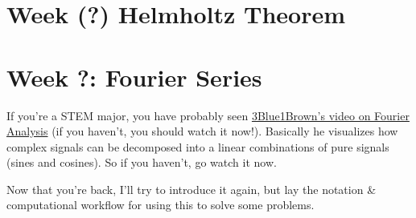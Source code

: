 \documentclass[12pt,fleqn]{article}
\numberwithin{equation}{section} %
\newcounter{problem}
\begin{document}
\section{Week (?) Helmholtz Theorem}

\newpage
\section{Week ?: Fourier Series}
If you're a STEM major, you have probably seen \href{https://www.youtube.com/watch?v=spUNpyF58BY}
{3Blue1Brown's video on Fourier Analysis} (if you haven't, you should watch it now!). Basically he visualizes how complex signals can be decomposed into a linear combinations of pure signals (sines and cosines). So if you haven't, go watch it now.

Now that you're back, I'll try to introduce it again, but lay the notation \& computational workflow for using this to solve some problems.
\end{document}
